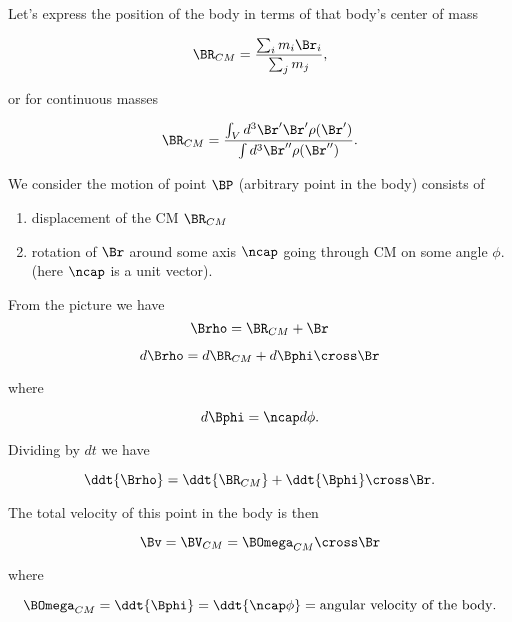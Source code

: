 Let's express the position of the body in terms of that body's center of mass

\begin{equation}\label{eqn:rigidBodyMotion:60}
\BR_{CM} = \frac{\sum_i m_i \Br_i}{\sum_j m_j},
\end{equation}

or for continuous masses

\begin{equation}\label{eqn:rigidBodyMotion:80}
\BR_{CM} = \frac{\int_V d^3 \Br' \Br' \rho(\Br')}{ \int d^3 \Br'' \rho(\Br'')}.
\end{equation}

We consider the motion of point $\BP$  (arbitrary point in the body) consists of

\begin{enumerate}
\item displacement of the CM $\BR_{CM}$
\item rotation of $\Br$ around some axis $\ncap$ going through CM on some angle $\phi$. (here $\ncap$ is a unit vector).
\end{enumerate}

From the picture we have
\begin{equation}\label{eqn:rigidBodyMotion:100}
\Brho = \BR_{CM} + \Br
\end{equation}

\begin{equation}\label{eqn:rigidBodyMotion:120}
d\Brho = d\BR_{CM} + d\Bphi \cross \Br
\end{equation}

where

\begin{equation}\label{eqn:rigidBodyMotion:140}
d\Bphi = \ncap d\phi.
\end{equation}

Dividing by $dt$ we have

\begin{equation}\label{eqn:rigidBodyMotion:160}
\ddt{\Brho} = \ddt{\BR_{CM}} + \ddt{\Bphi} \cross \Br.
\end{equation}

The total velocity of this point in the body is then

\begin{equation}\label{eqn:rigidBodyMotion:180}
\Bv = \BV_{CM} = \BOmega_{CM} \cross \Br
\end{equation}

where

\begin{equation}\label{eqn:rigidBodyMotion:200}
\BOmega_{CM} = \ddt{\Bphi} = \ddt{\ncap \phi} = \text{angular velocity of the body}.
\end{equation}

